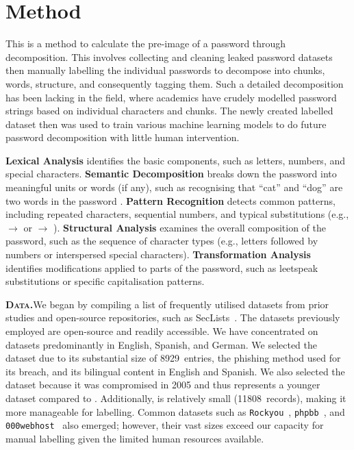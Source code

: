 \section{Method}
This is a method to calculate the pre-image of a password through decomposition. This involves collecting and cleaning leaked password datasets then manually labelling the individual passwords to decompose into chunks, words, structure, and consequently tagging them. Such a detailed decomposition has been lacking in the field, where academics have crudely modelled password strings based on individual characters and chunks. The newly created labelled dataset then was used to train various machine learning models to do future password decomposition with little human intervention.

\textbf{Lexical Analysis} identifies the basic components, such as letters, numbers, and special characters. \textbf{Semantic Decomposition} breaks down the password into meaningful units or words (if any), such as recognising that ``cat'' and ``dog'' are two words in the password . \textbf{Pattern Recognition} detects common patterns, including repeated characters, sequential numbers, and typical substitutions (e.g.,  $\rightarrow$  or  $\rightarrow$ ). \textbf{Structural Analysis} examines the overall composition of the password, such as the sequence of character types (e.g., letters followed by numbers or interspersed special characters). \textbf{Transformation Analysis} identifies modifications applied to parts of the password, such as leetspeak substitutions or specific capitalisation patterns.

\textbf{\textsc{Data.}}\;We began by compiling a list of frequently utilised datasets from prior studies and open-source repositories, such as SecLists~\cite{miessler_danielmiesslerseclists_2024}. The datasets previously employed are open-source and readily accessible. We have concentrated on datasets predominantly in English, Spanish, and German. We selected the \hmail dataset due to its substantial size of \num{8 929}~entries, the phishing method used for its breach, and its bilingual content in English and Spanish. We also selected the \lizardsquad dataset because it was compromised in 2005 and thus represents a younger dataset compared to \hmail. Additionally, \lizardsquad is relatively small (\num{11 808}~records), making it more manageable for labelling. Common datasets such as \texttt{Rockyou}~\cite{miessler_rockyou_2009}, \texttt{phpbb}~\cite{miessler_phpbb_2009}, and \texttt{000webhost}~\cite{miessler_000webhost_2015} also emerged; however, their vast sizes exceed our capacity for manual labelling given the limited human resources available.

